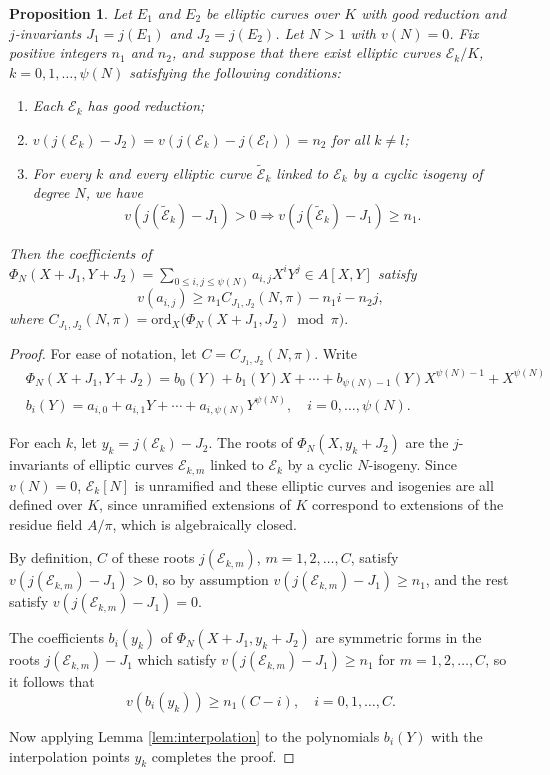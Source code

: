 \documentclass[11pt]{amsart}
\newtheorem{prop}{Proposition}[section]
\theoremstyle{definition}
\newcommand{\ord}{\mathrm{ord}}
\def\CE{\mathcal{E}}
\begin{document}
\begin{prop}\label{prop:general}
	Let $E_1$ and $E_2$ be elliptic curves over $K$ with good reduction and $j$-invariants $J_1 = j(E_1)$ and $J_2 = j(E_2)$.
    Let $N > 1$ with $v(N)=0$.
    Fix positive integers $n_1$ and $n_2$, and suppose that there exist elliptic curves $\CE_k/K$, $k=0,1,\ldots, \psi(N)$ satisfying the following conditions:
    \begin{enumerate}
        \item Each $\CE_k$ has good reduction;
        \item $v(j(\CE_k)-J_2) = v(j(\CE_k)-j(\CE_l)) = n_2$ for all $k\neq l$;
        \item For every $k$ and every elliptic curve $\tilde{\CE}_k$ linked to $\CE_k$ by a cyclic isogeny of degree $N$, we have
        \[
        v(j(\tilde{\CE}_k) - J_1) > 0 \Longrightarrow v(j(\tilde{\CE}_k) - J_1) \geq n_1.
        \]
    \end{enumerate}
    Then the coefficients of $\Phi_N(X+J_1, Y+J_2) = \sum_{0\leq i,j \leq \psi(N)}a_{i,j}X^iY^j\in A[X,Y]$ satisfy
    \[
    v(a_{i,j}) \geq n_1 C_{J_1,J_2}(N,\pi)-n_1 i-n_2 j,
    \]
    where $C_{J_1,J_2}(N,\pi) = \ord_X\big(\Phi_N(X+J_1,J_2) \bmod \pi\big).$
\end{prop}

\begin{proof}
	For ease of notation, let $C = C_{J_1,J_2}(N,\pi).$
Write 
\begin{align*}
    & \Phi_N(X+J_1,Y+J_2) = b_0(Y) + b_1(Y)X + \cdots + b_{\psi(N)-1}(Y)X^{\psi(N)-1} + X^{\psi(N)} \\
    & b_i(Y) = a_{i,0} + a_{i,1}Y + \cdots + a_{i,\psi(N)}Y^{\psi(N)}, \quad i=0,\ldots, \psi(N).
\end{align*}

For each $k$, let $y_k = j(\CE_k) - J_2$. The roots of $\Phi_N(X, y_k + J_2)$ are the $j$-invariants of elliptic curves $\CE_{k,m}$ linked to $\CE_k$ by a cyclic $N$-isogeny. Since $v(N)=0$, $\CE_k[N]$ is unramified and these elliptic curves and isogenies are all defined over $K$, since unramified extensions of $K$ correspond to extensions of the residue field $A/\pi$, which is algebraically closed.

By definition, $C$ of these roots $j(\CE_{k,m})$, $m=1,2,\ldots, C$, satisfy 
$v(j(\CE_{k,m})-J_1) >0$, so by assumption $v(j(\CE_{k,m} )-J_1) \geq n_1$, and the rest satisfy $v(j(\CE_{k,m})-J_1)=0$. 

The coefficients $b_i(y_k)$ of 
$\Phi_N(X+J_1, y_k+J_2)$ are symmetric forms in the roots $j(\CE_{k,m})-J_1$ which satisfy $v(j(\CE_{k,m})-J_1) \geq n_1$ for $m=1,2,\ldots, C$, so it follows that
\[
v(b_i(y_k)) \geq n_1(C -i), \quad i = 0, 1, \ldots, C.
\]

Now applying Lemma \ref{lem:interpolation} to the polynomials $b_i(Y)$ with the interpolation points $y_k$ completes the proof.
\end{proof}
\end{document}
